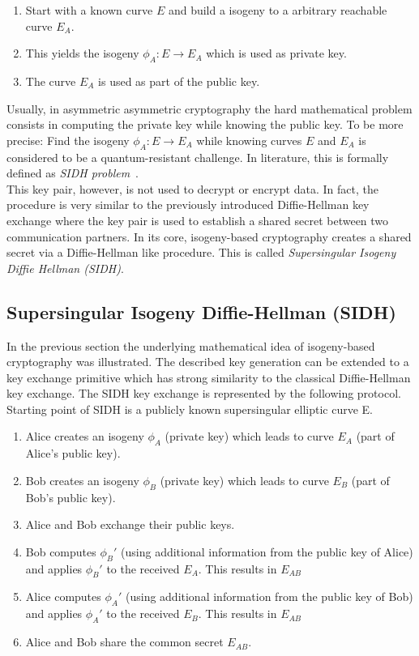 \begin{enumerate}
\item Start with a known curve $E$ and build a isogeny to a arbitrary reachable curve $E_A$.
\item This yields the isogeny $\phi_A: E \to E_A$ which is used as private key.
\item The curve $E_A$ is used as part of the public key.
\end{enumerate}
Usually, in asymmetric asymmetric cryptography the hard mathematical problem consists in computing the private key while knowing the public key. To be more precise: Find the isogeny $\phi_A: E \to E_A$ while knowing curves $E$ and $E_A$ is considered to be a quantum-resistant challenge. In literature, this is formally defined as \textit{\gls{SIDH} problem}~\parencite{sike2020spec}. 
\\
This key pair, however, is not used to decrypt or encrypt data. In fact, the procedure is very similar to the previously introduced Diffie-Hellman key exchange where the key pair is used to establish a shared secret between two communication partners.
In its core, isogeny-based cryptography creates a shared secret via a Diffie-Hellman like procedure. This is called \textit{Supersingular Isogeny Diffie Hellman (\gls{SIDH})}.

\subsection{Supersingular Isogeny Diffie-Hellman (\gls{SIDH})}

In the previous section the underlying mathematical idea of isogeny-based cryptography was illustrated. The described key generation can be extended to a key exchange primitive which has strong similarity to the classical Diffie-Hellman key exchange. The SIDH key exchange is represented by the following protocol.\\
Starting point of \gls{SIDH} is a publicly known supersingular elliptic curve E. 

\begin{enumerate}
\item Alice creates an isogeny $\phi_A$ (private key) which leads to curve $E_A$ (part of Alice's public key).
\item Bob creates an isogeny $\phi_B$ (private key) which leads to curve $E_B$ (part of Bob's public key).
\item Alice and Bob exchange their public keys.
\item Bob computes $\phi_B'$ (using additional information from the public key of Alice) and applies $\phi_B'$ to the received $E_A$. This results in $E_{AB}$
\item Alice computes $\phi_A'$ (using additional information from the public key of Bob) and applies $\phi_A'$ to the received $E_B$. This results in $E_{AB}$
\item Alice and Bob share the  common secret $E_{AB}$.
\end{enumerate}


